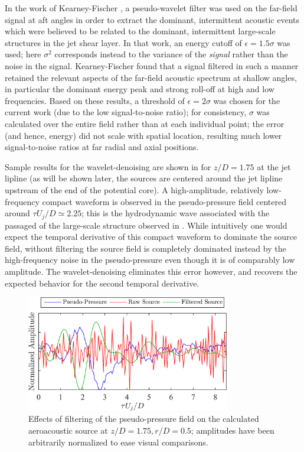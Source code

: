 In the work of Kearney-Fischer \etal [cite], a pseudo-wavelet filter was used on the far-field signal at aft angles in order to extract the dominant, intermittent acoustic events which were believed to be related to the dominant, intermittent large-scale structures in the jet shear layer. 
In that work, an energy cutoff of $\epsilon = 1.5\sigma$ was used; here $\sigma^2$ corresponds instead to the variance of the \textit{signal} rather than the noise in the signal. 
Kearney-Fischer \etal found that a signal filtered in such a manner retained the relevant aspects of the far-field acoustic spectrum at shallow angles, in particular the dominant energy peak and strong roll-off at high and low frequencies.
Based on these results, a threshold of $\epsilon = 2\sigma$ was chosen for the current work (due to the low signal-to-noise ratio); for consistency, $\sigma$ was calculated over the entire field rather than at each individual point; the error (and hence, energy) did not scale with spatial location, resulting much lower signal-to-noise ratios at far radial and axial positions. 

Sample results for the wavelet-denoising are shown in  for $z/D=1.75$ at the jet lipline (as will be shown later, the sources are centered around the jet lipline upstream of the end of the potential core).
A high-amplitude, relatively low-frequency compact waveform is observed in the pseudo-pressure field centered around $\tau U_j /D \simeq 2.25$; this is the hydrodynamic wave associated with the passaged of the large-scale structure observed in .
While intuitively one would expect the temporal derivative of this compact waveform to dominate the source field, without filtering the source field is completely dominated instead by the high-frequency noise in the pseudo-pressure even though it is of comparably low amplitude.
The wavelet-denoising eliminates this error however, and recovers the expected behavior for the second temporal derivative.
\begin{figure}
	\centering
	\includegraphics[width = 3.5in]{Figures/ch5_valid_denoising.png}
	\caption{Effects of filtering of the pseudo-pressure field on the calculated aeroacoustic source at $z/D = 1.75, r/D = 0.5$; amplitudes have been arbitrarily normalized to ease visual comparisons.}
	\label{fig:valid_denoising}
\end{figure}

